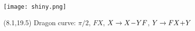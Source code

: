 \documentclass[final]{beamer}
\newcommand{\nt}{\negthinspace}
\newcommand{\m}{\nt-\nt}
\newcommand{\p}{\nt+\nt}
\begin{document}
\begin{frame}{}
\texttt{[image: shiny.png]}
\begin{textblock}{20}(8.1,19.5)
Dragon curve: $\pi/2$, $FX$, $X\to X\m YF$, $Y\to FX\p Y$
\end{textblock}
\end{frame}
\end{document}
